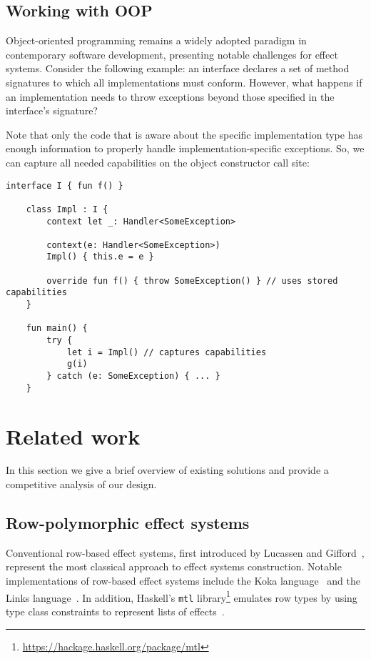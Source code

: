 \documentclass[acmsmall,review,screen]{acmart}
\begin{document}
\subsection{Working with OOP} \label{subsec:oop}

Object-oriented programming remains a widely adopted paradigm in contemporary software development, presenting notable challenges for effect systems.
Consider the following example: an interface declares a set of method signatures to which all implementations must conform.
However, what happens if an implementation needs to throw exceptions beyond those specified in the interface’s signature?

Note that only the code that is aware about the specific implementation type has enough information to properly handle implementation-specific exceptions.
So, we can capture all needed capabilities on the object constructor call site:
\begin{lstlisting}[language=colang]
    interface I { fun f() }

    class Impl : I {
        context let _: Handler<SomeException>

        context(e: Handler<SomeException>)
        Impl() { this.e = e }

        override fun f() { throw SomeException() } // uses stored capabilities
    }

    fun main() {
        try {
            let i = Impl() // captures capabilities
            g(i)
        } catch (e: SomeException) { ... }
    }
\end{lstlisting}


\section{Related work} \label{sec:related}

In this section we give a brief overview of existing solutions and provide a competitive analysis of our design.

\subsection{Row-polymorphic effect systems} \label{subsec:overview-rows}

Conventional row-based effect systems, first introduced by Lucassen and Gifford~\cite{lucassen1988polymorphic}, represent the most classical approach to effect systems construction.
Notable implementations of row-based effect systems include the Koka language~\cite{leijen2014koka, leijen2017type} and the Links language~\cite{hillerstrom2016liberating}.
In addition, Haskell's \texttt{mtl} library\footnote{\url{https://hackage.haskell.org/package/mtl}} emulates row types by using type class constraints to represent lists of effects~\cite{jones1995functional}.
\end{document}
